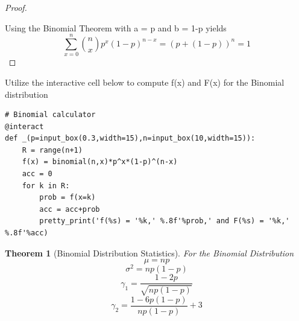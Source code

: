 \documentclass[10pt,]{book}
\theoremstyle{plain}
\newtheorem{theorem}{Theorem}[section]
\theoremstyle{definition}
\theoremstyle{definition}
\theoremstyle{definition}
\numberwithin{equation}{section}
\begin{document}
\begin{proof}\hypertarget{proof-35}{}

		Using the Binomial Theorem with a = p and b = 1-p yields
		\begin{equation*}\sum_{x=0}^n \binom{n}{x}p^x(1-p)^{n-x} = (p + (1-p))^n = 1\end{equation*}
\end{proof}
\par
Utilize the interactive cell below to compute f(x) and F(x) for the Binomial distribution%
\begin{lstlisting}[style=sageinput]
# Binomial calculator
@interact
def _(p=input_box(0.3,width=15),n=input_box(10,width=15)):
    R = range(n+1)
    f(x) = binomial(n,x)*p^x*(1-p)^(n-x)
    acc = 0
    for k in R:
        prob = f(x=k)
        acc = acc+prob
        pretty_print('f(%s) = '%k,' %.8f'%prob,' and F(%s) = '%k,' %.8f'%acc)
\end{lstlisting}
\begin{theorem}[{Binomial Distribution Statistics}]\label{theorem-35}
For the Binomial Distribution
	\begin{equation*}\mu = np\end{equation*}
	\begin{equation*}\sigma^2 = np(1-p)\end{equation*}
	\begin{equation*}\gamma_1 = \frac{1-2p}{\sqrt{np(1-p)}}\end{equation*}
	\begin{equation*}\gamma_2 = \frac{1-6p(1-p)}{np(1-p)} + 3\end{equation*}
\end{theorem}
\end{document}
